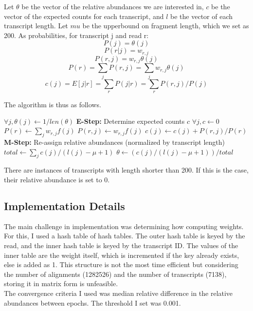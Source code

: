 \documentclass{article}
\begin{document}
\break

Let $\theta$ be the vector of the relative abundances we are interested in, $c$ be the vector of the expected counts for each transcript, and $l$ be the vector of each transcript length. Let $mu$ be the upperbound on fragment length, which we set as 200. As probabilities, for transcript j and read r:
$$P(j) = \theta(j)$$
$$P(r|j) = w_{r,j}$$
$$P(r, j) = w_{r, j}\theta(j)$$
$$P(r) = \sum_{j}{P(r,j)} = \sum_{j}{w_{r,j}\theta(j)}$$
$$c(j) = E[j|r] = \sum_{r}{P(j|r)} = \sum_{r}{P(r,j)/P(j)}$$

The algorithm is thus as follows.\\

\begin{algorithmic}
    \State $\forall j, \theta(j) \gets 1/len(\theta)$
        \State \textbf{E-Step:} Determine expected counts $c$
        \State $\forall j, c \gets 0$
            \State $P(r) \gets \sum_{j}{w_{r,j}f(j)}$
                \State $P(r,j) \gets w_{r,j}f(j)$
                \State $c(j) \gets c(j) + P(r, j)/P(r)$
            \EndFor
        \EndFor
        \State \textbf{M-Step:} Re-assign relative abundances (normalized by transcript length)
        \State $total \gets \sum_{j}{c(j)/(l(j)-\mu + 1)}$
            \State $\theta \gets (c(j)/(l(j)-\mu + 1))/total$
        \EndFor

    \EndWhile
\end{algorithmic}
\vspace{1em}
There are instances of transcripts with length shorter than 200. If this is the case, their relative abundance is set to 0.

\break
\subsection*{Implementation Details}

The main challenge in implementation was determining how computing weights. For this, I used a hash table of hash tables. The outer hash table is keyed by the read, and the inner hash table is keyed by the transcript ID. The values of the inner table are the weight itself, which is incremented if the key already exists, else is added as 1. This structure is not the most time efficient but considering the number of alignments (1282526) and the number of transcripts (7138), storing it in matrix form is unfeasible.
\\
The convergence criteria I used was median relative difference in the relative abundances between epochs. The threshold I set was 0.001.
\end{document}

